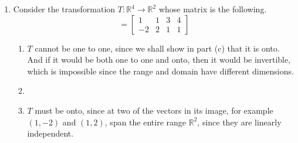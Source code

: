 \documentclass{article}
\newenvironment{answers}{ %
	\begin{enumerate}
		\setlength{\itemsep}{\bigskipamount}
}{\end{enumerate}}
\newcommand{\R}{\mathbb{R}}
\begin{document}
\begin{answers}
\begin{enumerate}
				To find two such vectors, we can apply \(T\) to two vectors in the domain, then verify that they are indeed independent. We shall choose the vectors \((1, 0, 0)\) and \((0, 0, 1)\). Applying \(T\) to these gives us a basis \(\{(1, 2), (0, -1)\}\), which is indeed independent.
		\end{enumerate}

	\item
		Consider the transformation \(T:\R^4 \to \R^2\) whose matrix is the following.
		\begin{equation*}
			[T] = \left[ \begin{matrix}
					1  & 1 & 3 & 4 \\
					-2 & 2 & 1 & 1
				\end{matrix} \right]
		\end{equation*}
		\begin{enumerate}
			\item
				\(T\) cannot be one to one, since we shall show in part (c) that it is onto. And if it would be both one to one and onto, then it would be invertible, which is impossible since the range and domain have different dimensions.
			\item
			\item
				\(T\) must be onto, since at two of the vectors in its image, for example \((1, -2)\) and \((1, 2)\), span the entire range \(\R^2\), since they are linearly independent.
		\end{enumerate}
\end{answers}
\end{document}
